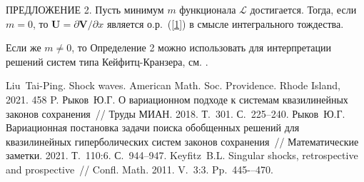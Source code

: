 ПРЕДЛОЖЕНИЕ 2. Пусть минимум $m$ функционала $\mathcal L$
достигается. Тогда, если $m=0$, то
$\mathbf{U}=\partial\mathbf{V}/\partial x$ является о.р.~(\ref{1})
в смысле интегрального тождества.

Если же $m\neq 0$, то Определение 2 можно использовать для
интерпретации решений систем типа Кейфитц-Кранзера, см. \cite{Key}.




%

\begin{thebibliography}{9} %
 Liu~Tai-Ping. Shock waves. American Math. Soc.
    Providence. Rhode Island, 2021. 458 P.
 Рыков~Ю.Г. О вариационном подходе к системам
    квазилинейных законов сохранения~// Труды МИАН. 2018. Т.~301.
    С.~225--240.
 Рыков~Ю.Г. Вариационная постановка задачи поиска
    обобщенных решений для квазилинейных гиперболических систем законов
    сохранения~// Математические заметки. 2021. Т.~110:6. С.~944--947.
 Keyfitz~B.L. Singular shocks, retrospective and
    prospective~// Confl. Math. 2011. V.~3:3. Pp.~445-–470.
\end{thebibliography}






%
